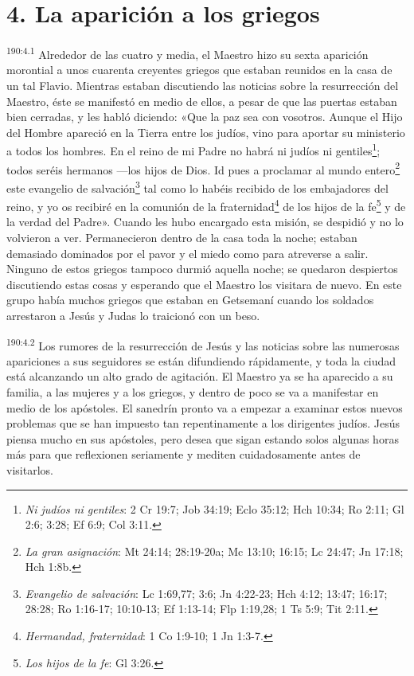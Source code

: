 \section*{4. La aparición a los griegos}
\par 
\textsuperscript{190:4.1} Alrededor de las cuatro y media, el Maestro hizo su sexta aparición morontial a unos cuarenta creyentes griegos que estaban reunidos en la casa de un tal Flavio. Mientras estaban discutiendo las noticias sobre la resurrección del Maestro, éste se manifestó en medio de ellos, a pesar de que las puertas estaban bien cerradas, y les habló diciendo: «Que la paz sea con vosotros. Aunque el Hijo del Hombre apareció en la Tierra entre los judíos, vino para aportar su ministerio a todos los hombres. En el reino de mi Padre no habrá ni judíos ni gentiles\footnote{\textit{Ni judíos ni gentiles}: 2 Cr 19:7; Job 34:19; Eclo 35:12; Hch 10:34; Ro 2:11; Gl 2:6; 3:28; Ef 6:9; Col 3:11.}; todos seréis hermanos ---los hijos de Dios. Id pues a proclamar al mundo entero\footnote{\textit{La gran asignación}: Mt 24:14; 28:19-20a; Mc 13:10; 16:15; Lc 24:47; Jn 17:18; Hch 1:8b.} este evangelio de salvación\footnote{\textit{Evangelio de salvación}: Lc 1:69,77; 3:6; Jn 4:22-23; Hch 4:12; 13:47; 16:17; 28:28; Ro 1:16-17; 10:10-13; Ef 1:13-14; Flp 1:19,28; 1 Ts 5:9; Tit 2:11.} tal como lo habéis recibido de los embajadores del reino, y yo os recibiré en la comunión de la fraternidad\footnote{\textit{Hermandad, fraternidad}: 1 Co 1:9-10; 1 Jn 1:3-7.} de los hijos de la fe\footnote{\textit{Los hijos de la fe}: Gl 3:26.} y de la verdad del Padre». Cuando les hubo encargado esta misión, se despidió y no lo volvieron a ver. Permanecieron dentro de la casa toda la noche; estaban demasiado dominados por el pavor y el miedo como para atreverse a salir. Ninguno de estos griegos tampoco durmió aquella noche; se quedaron despiertos discutiendo estas cosas y esperando que el Maestro los visitara de nuevo. En este grupo había muchos griegos que estaban en Getsemaní cuando los soldados arrestaron a Jesús y Judas lo traicionó con un beso.

\par 
\textsuperscript{190:4.2} Los rumores de la resurrección de Jesús y las noticias sobre las numerosas apariciones a sus seguidores se están difundiendo rápidamente, y toda la ciudad está alcanzando un alto grado de agitación. El Maestro ya se ha aparecido a su familia, a las mujeres y a los griegos, y dentro de poco se va a manifestar en medio de los apóstoles. El sanedrín pronto va a empezar a examinar estos nuevos problemas que se han impuesto tan repentinamente a los dirigentes judíos. Jesús piensa mucho en sus apóstoles, pero desea que sigan estando solos algunas horas más para que reflexionen seriamente y mediten cuidadosamente antes de visitarlos.

